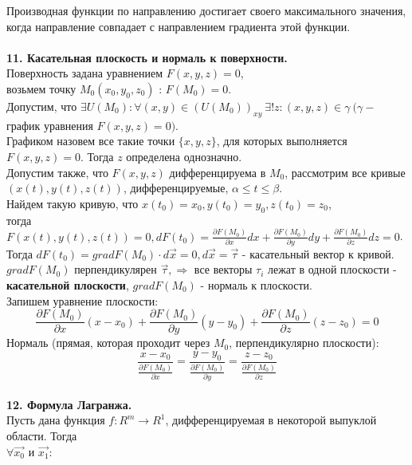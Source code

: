\documentclass[12pt]{article}
\begin{document}
Производная функции по направлению достигает своего максимального значения, когда направление совпадает с направлением градиента этой функции.\\
\\
\label{question11}\textbf{11. Касательная плоскость и нормаль к поверхности.}\\
Поверхность задана уравнением $F(x,y,z) = 0$, \\возьмем точку $M_0(x_0,y_0,z_0)$ : $F(M_0) = 0$.\\
Допустим, что $\exists U(M_0) : \forall (x,y) \in (U(M_0))_{xy} \ \exists!{z} : (x,y,z) \in \gamma \ (\gamma -$ график уравнения $F(x,y,z) = 0)$.\\
Графиком назовем все такие точки $\{x,y,z\}$, для которых выполняется $F(x,y,z) = 0$. Тогда $z$ определена однозначно.\\
Допустим также, что $F(x,y,z)$ дифференцируема в $M_0$, рассмотрим все кривые $(x(t),y(t),z(t))$, дифференцируемые, $\alpha \leq t \leq \beta$.\\
Найдем такую кривую, что $x(t_0) = x_0, y(t_0) = y_0, z(t_0) = z_0$, \\
тогда $F(x(t), y(t), z(t)) = 0, dF(t_0) = \frac{\partial F(M_0)}{\partial x}dx+\frac{\partial F(M_0)}{\partial y}dy+\frac{\partial F(M_0)}{\partial z}dz = 0$.\\
Тогда $dF(t_0) = gradF(M_0) \cdot d\overrightarrow{x} = 0, d\overrightarrow{x} = \overrightarrow{\tau}$ - касательный вектор к кривой.\\
$gradF(M_0)$ перпендикулярен $\overrightarrow{\tau}, \Rightarrow$ все векторы $\tau_i$ лежат в одной плоскости - \textbf{касательной плоскости}, $gradF(M_0)$ - нормаль к плоскости.\\
Запишем уравнение плоскости:\\
$$\frac{\partial F(M_0)}{\partial x}(x-x_0)+\frac{\partial F(M_0)}{\partial y}(y-y_0)+\frac{\partial F(M_0)}{\partial z}(z-z_0)=0$$
Нормаль (прямая, которая проходит через $M_0$, перпендикулярно плоскости):\\
$$\frac{x-x_0}{\frac{\partial F(M_0)}{\partial x}}=\frac{y-y_0}{\frac{\partial F(M_0)}{\partial y}}=\frac{z-z_0}{\frac{\partial F(M_0)}{\partial z}}$$
\\
\label{question12}\textbf{12. Формула Лагранжа.}\\
Пусть дана функция $f:R^m\to R^1$, дифференцируемая в некоторой выпуклой области. Тогда\\
$\forall \overrightarrow{x_0}$ и $\overrightarrow{x_1}:$\\
\end{document}
